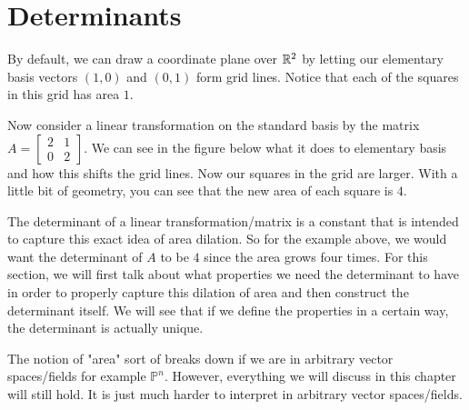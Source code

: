 \chapter{Determinants}

By default, we can draw a coordinate plane over $\mathbb{R}^2$ by letting our elementary basis vectors $(1,0)$ and $(0,1)$ form grid lines. Notice that each of the squares in this grid has area $1$.

Now consider a linear transformation on the standard basis by the matrix $A=\begin{bmatrix}
    2 & 1 \\
    0 & 2
\end{bmatrix}$. We can see in the figure below what it does to elementary basis and how this shifts the grid lines. Now our squares in the grid are larger. With a little bit of geometry, you can see that the new area of each square is $4$.

The determinant of a linear transformation/matrix is a constant that is intended to capture this exact idea of area dilation. So for the example above, we would want the determinant of $A$ to be $4$ since the area grows four times. For this section, we will first talk about what properties we need the determinant to have in order to properly capture this dilation of area and then construct the determinant itself. We will see that if we define the properties in a certain way, the determinant is actually unique.
\begin{remark}
    The notion of "area" sort of breaks down if we are in arbitrary vector spaces/fields for example $\mathbb{P}^n$. However, everything we will discuss in this chapter will still hold. It is just much harder to interpret in arbitrary vector spaces/fields.
\end{remark}
